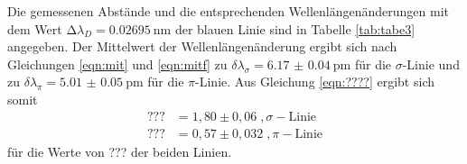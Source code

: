 Die gemessenen Abstände und die entsprechenden Wellenlängenänderungen mit dem Wert
$\increment \lambda_D = \SI{0.02695}{\nano\meter}$ der blauen Linie sind in Tabelle
\ref{tab:tabe3} angegeben.
Der Mittelwert der Wellenlängenänderung ergibt sich nach Gleichungen \ref{eqn:mit} und
\ref{eqn:mitf} zu $ \delta \lambda_{\sigma} = \SI{6.17(4)}{\pico\meter} $ für die $\sigma$-Linie
und zu $ \delta \lambda_{\pi} = \SI{5.01(5)}{\pico\meter} $ für die $\pi$-Linie.
Aus Gleichung \ref{eqn:????} ergibt sich somit
\begin{align}
  ???&=1,80 \pm 0,06 \; , \sigma-\text{Linie}\\
  ???&=0,57 \pm 0,032 \; , \pi-\text{Linie}
\end{align}
für die Werte von ??? der beiden Linien.
